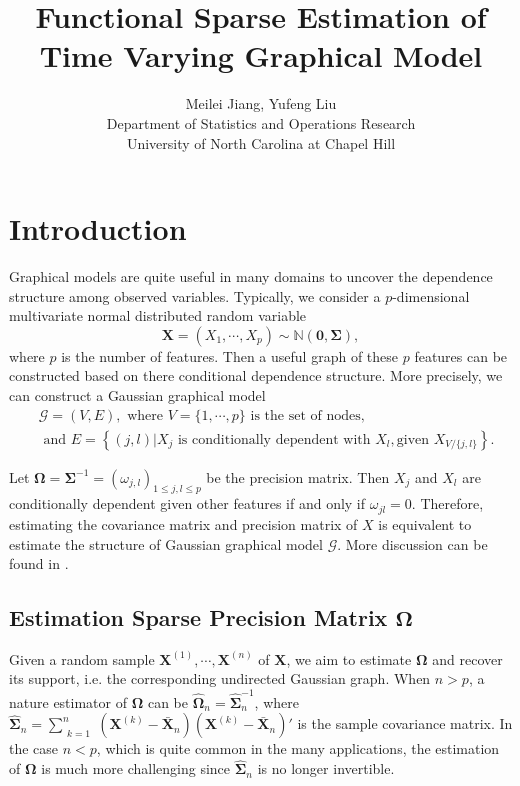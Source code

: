 \documentclass[11pt]{article}
\newcommand{\N}{\mathbb N}
\newcommand{\bX}{\mathbf X}
\newcommand{\bOmega}{{\boldsymbol{\Omega}}}
\newcommand{\bSigma}{{\boldsymbol{\Sigma}}}
\begin{document}
\author{Meilei Jiang, Yufeng Liu\\
    Department of Statistics and Operations Research\\
		University of North Carolina at Chapel Hill}
\title{Functional Sparse Estimation of Time Varying Graphical Model}

\maketitle

\section{Introduction}

Graphical models are quite useful in many domains to uncover the dependence structure among observed variables. Typically, we consider a $p$-dimensional multivariate normal distributed random variable 
$$ \bX = (X_1, \cdots, X_p) \sim \N(\mathbf{0}, \bSigma),$$ 
where $p$ is the number of features. Then a useful graph of these $p$ features can be constructed based on there conditional dependence structure. More precisely, we can construct a Gaussian graphical model
$$\begin{aligned}
&\mathcal{G} = (V, E), \text{ where } V = \{ 1, \cdots, p\}\text{ is the set of nodes, }\\
&\text{ and } E = \left\{ (j, l) | X_j \text{ is conditionally dependent with } X_l, \text{given } X_{V/\{j, l\}}\right\}.
\end{aligned}$$
     

Let $\bOmega = \bSigma^{-1} = (\omega_{j,l})_{1\leq j, l \leq p}$ be the precision matrix. Then $X_j$ and $X_l$ are conditionally dependent given other features if and only if $\omega_{jl} = 0$. Therefore, estimating the covariance matrix and precision matrix of $X$ is equivalent to estimate the structure of Gaussian graphical model $\mathcal{G}$. More discussion can be found in \citep{lauritzen1996graphical}.

\subsection{Estimation Sparse Precision Matrix $\bOmega$}

Given a random sample $\bX^{(1)}, \cdots,\bX^{(n)}$ of $\bX$, we aim to estimate $\bOmega$ and recover its support, i.e. the corresponding undirected Gaussian graph. When $n > p$, a nature estimator of $\bOmega$ can be $\hat{\bOmega}_n = \hat{\bSigma}_n^{-1}$, where $\hat{\bSigma}_n = \sum_{\substack{k = 1}}^{n} (\bX^{(k)} - \bar{\bX}_n)(\bX^{(k)} - \bar{\bX}_n)'$ is the sample covariance matrix. In the case $n < p$, which is quite common in the many applications, the estimation of $\bOmega$ is much more challenging since  $\hat{\bSigma}_n$ is no longer invertible.
\end{document}
